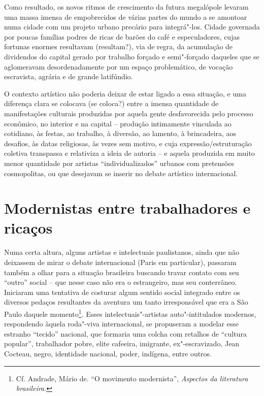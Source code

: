 Como resultado, os novos ritmos de crescimento da futura megalópole
levaram uma massa imensa de empobrecidos de várias partes do mundo a se
amontoar numa cidade com um projeto urbano precário para integrá"-los.
Cidade governada por poucas famílias podres de ricas de barões do café e
especuladores, cujas fortunas enormes resultavam (resultam?), via de
regra, da acumulação de dividendos do capital gerado por trabalho
forçado e semi"-forçado daqueles que se aglomeravam desordenadamente por
um espaço problemático, de vocação escravista, agrária e de grande
latifúndio.

O contexto artístico não poderia deixar de estar ligado a essa situação,
e uma diferença clara se colocava (se coloca?) entre a imensa quantidade
de manifestações culturais produzidas por aquela gente desfavorecida
pelo processo econômico, no interior e na capital -- produção
intimamente vinculada ao cotidiano, às festas, ao trabalho, à diversão,
ao lamento, à brincadeira, aos desafios, às datas religiosas, às vezes
sem motivo, e cuja expressão/estruturação coletiva transpassa e
relativiza a ideia de autoria -- e aquela produzida em muito menor
quantidade por artistas ``individualizados'' urbanos com pretensões
cosmopolitas, ou que desejavam se inserir no debate artístico
internacional.

\section{Modernistas entre trabalhadores e ricaços}

Numa certa altura, alguns artistas e intelectuais paulistanos, ainda que
não deixassem de mirar o debate internacional (Paris em particular),
passaram também a olhar para a situação brasileira buscando travar
contato com seu ``outro'' social -- que nesse caso não era o
estrangeiro, mas seu conterrâneo. Iniciaram uma tentativa de costurar
algum sentido social integrado entre os diversos pedaços resultantes da
aventura um tanto irresponsável que era a São Paulo daquele
momento\footnote{Cf. Andrade, Mário de. ``O movimento modernista'',
  \emph{Aspectos da literatura brasileira}.}. Esses
intelectuais"-artistas auto"-intitulados modernos, respondendo àquela
roda"-viva internacional, se propuseram a modelar esse estranho
``tecido'' nacional, que formaria uma colcha com retalhos de ``cultura
popular'', trabalhador pobre, elite cafeeira, imigrante, ex"-escravizado,
Jean Cocteau, negro, identidade nacional, poder, indígena, entre outros.

